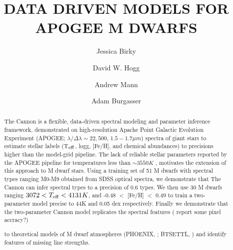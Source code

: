 \documentclass[modern]{aastex62}
\begin{document}
\title{DATA DRIVEN MODELS FOR APOGEE M DWARFS}



\author[0000-0002-7961-6881]{Jessica Birky}

\author[0000-0003-2866-9403]{David W. Hogg}

\author[0000-0003-3654-1602]{Andrew Mann}

\author[0000-0002-6523-9536]{Adam Burgasser}

\begin{abstract}

The Cannon \citep{Ness:2015} is a flexible, data-driven spectral modeling and parameter inference framework, demonstrated on high-resolution Apache Point Galactic Evolution Experiment (APOGEE; $\lambda/\Delta\lambda\sim22,500$, $1.5-1.7 \mu m$) spectra of giant stars to estimate stellar labels (T$_{\rm eff}$, logg, [Fe/H], and chemical abundances) to precisions higher than the model-grid pipeline. The lack of reliable stellar parameters reported by the APOGEE pipeline for temperatures less than $\sim3550K$ \citep{Schmidt:2016}, motivates the extension of this approach to M dwarf stars. Using a training set of 51 M dwarfs with spectral types ranging M0-M9 obtained from SDSS optical spectra, we demonstrate that The Cannon can infer spectral types to a precision of 0.6 types. We then use 30 M dwarfs ranging $3072 < T_{\rm eff} < 4131K$, and -0.48 $<$ [Fe/H] $<$ 0.49 to train a two-parameter model precise to 44K and 0.05 dex respectively. Finally we demonstrate that the two-parameter Cannon model replicates the spectral features (\color{gcolor}{HOGG:}\color{black} report some pixel accracy?)

to theoretical models of M dwarf atmospheres (PHOENIX, \citealt{Husser:2013}; BTSETTL, \citealt{Allard:2011}) and identify features of missing line strengths.

\end{abstract}
\end{document}

